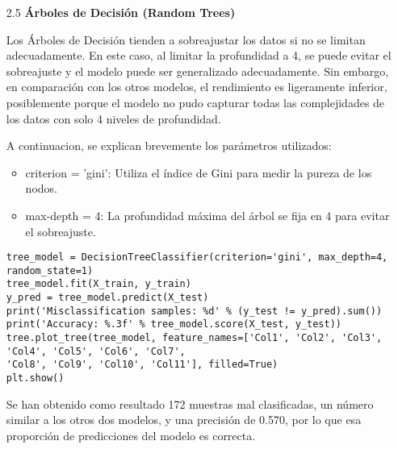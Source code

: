 \documentclass{article}
\begin{document}
\bigskip

\begin{itemize}

\item[2.5]  {\bf \'Arboles de Decisi\'on (Random Trees)}

Los \'Arboles de Decisi\'on tienden a sobreajustar los datos si no se limitan adecuadamente. En este caso, al limitar la profundidad a 4, se puede evitar el sobreajuste y el modelo puede ser generalizado adecuadamente. Sin embargo, en comparaci\'on con los otros modelos, el rendimiento es ligeramente inferior, posiblemente porque el modelo no pudo capturar todas las complejidades de los datos con solo 4 niveles de profundidad.

A continuacion, se explican brevemente los par\'ametros utilizados:

\begin{itemize}

\item
criterion = 'gini': Utiliza el índice de Gini para medir la pureza de los nodos.

\item
max-depth = 4: La profundidad m\'axima del \'arbol se fija en 4 para evitar el sobreajuste.

\end{itemize}

\begin{tcolorbox}[width=14cm]
\begin{scriptsize}
\begin{verbatim}
tree_model = DecisionTreeClassifier(criterion='gini', max_depth=4, random_state=1)
tree_model.fit(X_train, y_train)
y_pred = tree_model.predict(X_test)
print('Misclassification samples: %d' % (y_test != y_pred).sum())
print('Accuracy: %.3f' % tree_model.score(X_test, y_test))
tree.plot_tree(tree_model, feature_names=['Col1', 'Col2', 'Col3', 'Col4', 'Col5', 'Col6', 'Col7', 
'Col8', 'Col9', 'Col10', 'Col11'], filled=True)
plt.show()
\end{verbatim}
\end{scriptsize}
\end{tcolorbox}

Se han obtenido como resultado 172 muestras mal clasificadas, un n\'umero similar a los otros dos modelos, y una precisi\'on de 0.570, por lo que esa proporci\'on de predicciones del modelo es correcta.

\end{itemize}

\end{document}
